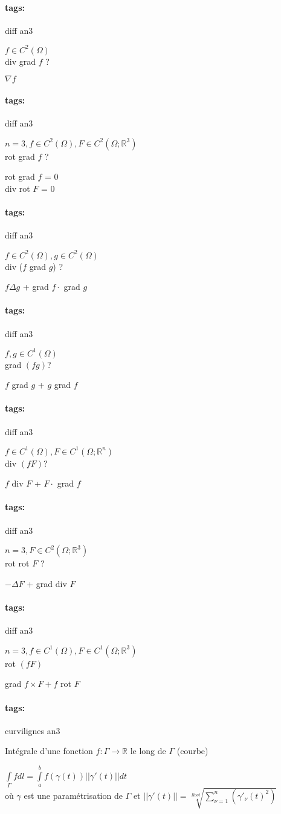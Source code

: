 \documentclass[12pt]{article}
\newcommand*{\xfield}[1]{\begin{mdframed}\centering #1\end{mdframed}\bigskip}
\newenvironment{note}{}{}
\newcommand*{\tags}[1]{\paragraph{tags: }#1}
\begin{document}
\begin{note}
	\tags{diff an3}
	\xfield{$f \in C^2(\Omega)$  \\
	div grad $f$ ?}
	\xfield{$\nabla f$}
\end{note}

\begin{note}
	\tags{diff an3}
	\xfield{$n=3,f \in C^2(\Omega) , F \in C^2(\Omega;\mathbb{R}^3 )$ \\
	rot grad $f$ ?}
	\xfield{rot grad $f$ = 0 \\ 
	div rot $F$ = 0}
\end{note}

\begin{note}
	\tags{diff an3}
	\xfield{$f \in C^2(\Omega),g \in C^2(\Omega)$  \\
	div ($f$ grad $g$) ?}
	\xfield{$f\Delta g$ + grad $f \cdot$ grad $g$}
\end{note}

\begin{note}
	\tags{diff an3}
	\xfield{$f,g \in C^1(\Omega)$ \\
	grad $(fg)$?}
	\xfield{$f$ grad $g$ + $g$ grad $f$}
\end{note}

\begin{note}
	\tags{diff an3}
	\xfield{$f \in C^1(\Omega) , F \in C^1(\Omega;\mathbb{R}^n )$  \\
	div $(fF)$?}
	\xfield{$f$ div $F$ + $F \cdot$ grad $f$}
\end{note}

\begin{note}
	\tags{diff an3}
	\xfield{$n=3, F \in C^2(\Omega;\mathbb{R}^3 )$ \\
	rot rot $F$ ?}
	\xfield{$-\Delta F$ + grad div $F$}
\end{note}

\begin{note}
	\tags{diff an3}
	\xfield{$n=3, f \in C^1(\Omega) , F \in C^1(\Omega;\mathbb{R}^3)$ \\
	rot $(fF)$}
	\xfield{grad $f \times F + f$ rot $F$}
\end{note}

\begin{note}
	\tags{curvilignes an3}
	\xfield{Intégrale d'une fonction $f: \Gamma \to \mathbb{R}$ le long de
    $\Gamma$ (courbe)}
	\xfield{$\int\limits_\Gamma f dl = \int\limits_a^b f(\gamma(t)) ||\gamma'(t)||
    dt$\\
où $\gamma$ est une paramétrisation de $\Gamma$ et $||\gamma'(t)|| =
\sqrt[Root]{\sum\limits_{\nu = 1}^n (\gamma'_{\nu}(t)^2)}$}
\end{note}
\end{document}
